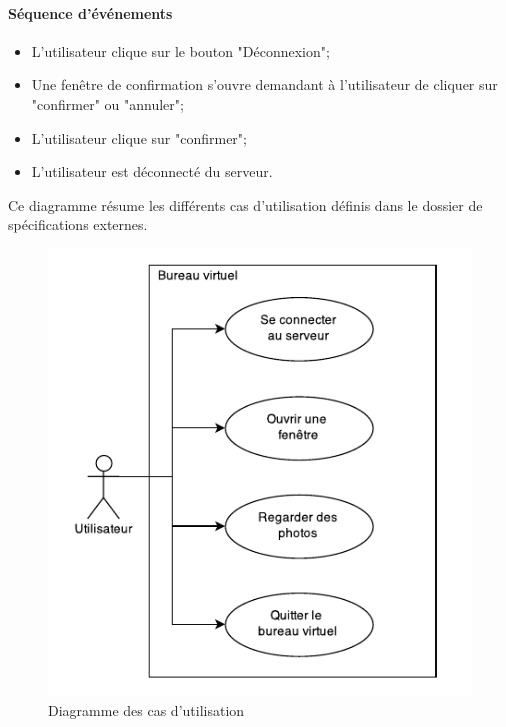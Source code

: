 \paragraph{Séquence d'événements}
\begin{itemize}
	\item L'utilisateur clique sur le bouton "Déconnexion";
	\item Une fenêtre de confirmation s'ouvre demandant à l'utilisateur de cliquer sur "confirmer" ou "annuler";
	\item L'utilisateur clique sur "confirmer";
	\item L'utilisateur est déconnecté du serveur.
\end{itemize}


Ce diagramme résume les différents cas d'utilisation définis dans le dossier de spécifications externes.

\begin{figure}[H]
	\centering
	\includegraphics{diagrammes/DCU.pdf}
	\caption{Diagramme des cas d'utilisation}
\end{figure}